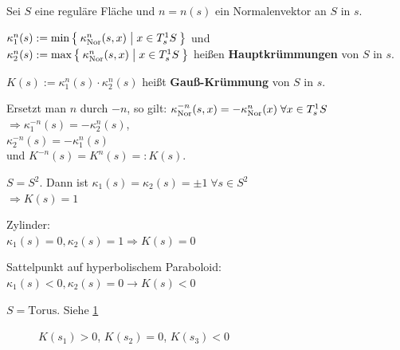 \begin{definition}%
    Sei $S$ eine reguläre Fläche und $n=n(s)$ ein Normalenvektor an 
    $S$ in $s$.

    \begin{defenum}
        \item $\kappa^n_1(s) := \min \Set{\kappa_{\textnormal{Nor}}^n(s,x) | x \in T_s^1 S}$ und\\
              $\kappa^n_2(s) := \max \Set{\kappa_{\textnormal{Nor}}^n(s,x) | x \in T_s^1 S}$
              heißen \textbf{Hauptkrümmungen} von $S$ in $s$.
        \item $K(s) := \kappa_1^n(s) \cdot \kappa_2^n(s)$ heißt
              \textbf{Gauß-Krümmung} von $S$ in $s$.
    \end{defenum}
\end{definition}

\begin{bemerkung}%
    Ersetzt man $n$ durch $-n$, so gilt: $\kappa_{\textnormal{Nor}}^{-n}(s, x) = - \kappa_{\textnormal{Nor}}^n(x)\; \forall x \in T_s^1 S$\\
    $\Rightarrow \kappa_1^{-n}(s) = - \kappa_2^n(s)$,\\
    $\kappa_2^{-n}(s) = - \kappa_1^n (s)$\\
    und $K^{-n}(s) = K^n(s) =: K(s)$.
\end{bemerkung}

\begin{beispiel}
    \begin{bspenum}
        \item $S = S^2$. Dann ist $\kappa_1(s) = \kappa_2(s) = \pm 1\;\forall s \in S^2$\\
              $\Rightarrow K(s) = 1$
        \item Zylinder:\\
              $\kappa_1(s) = 0, \kappa_2(s) = 1 \Rightarrow K(s) = 0$
        \item Sattelpunkt auf hyperbolischem Paraboloid:\\
              $\kappa_1(s) < 0, \kappa_2(s) = 0 \rightarrow K(s) < 0$
        \item $S = \text{Torus}$. Siehe \cref{fig:torus-gauss-kruemmung}\\
            \begin{figure}[htp]
                \centering
                 
                \caption{$K(s_1) > 0$, $K(s_2) = 0$, $K(s_3) < 0$}
                \label{fig:torus-gauss-kruemmung}
            \end{figure}
    \end{bspenum}
\end{beispiel}

